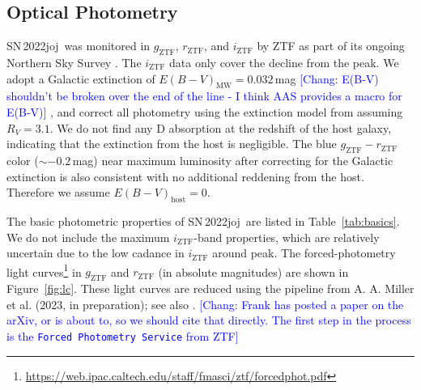 \documentclass[twocolumn]{aastex631}
\newcommand{\sn}{SN\,2022joj}
\newcommand{\chang}[1]{\textcolor{blue}{[Chang: #1]}}
\begin{document}
\begin{CJK*}{UTF8}{gbsn}
\subsection{Optical Photometry}
\sn\ was monitored in $g_\mathrm{ZTF}$, $r_\mathrm{ZTF}$, and $i_\mathrm{ZTF}$ by ZTF as part of its ongoing Northern Sky Survey \citep{Bellm_ZTF_2019b}. The $i_\mathrm{ZTF}$ data only cover the decline from the peak. We adopt a Galactic extinction of $E(B-V)_\mathrm{MW}=0.032$\,mag \chang{E(B-V) shouldn't be broken over the end of the line - I think AAS provides a macro for E(B-V)} \citep{Schlafly2011}, and correct all photometry using the extinction model from \citet{Fitzpatrick1999} assuming $R_V=3.1$. We do not find any  D absorption at the redshift of the host galaxy, indicating that the extinction from the host is negligible. The blue $g_\mathrm{ZTF}-r_\mathrm{ZTF}$ color ($\sim$$-0.2$\,mag) near maximum luminosity after correcting for the Galactic extinction is also consistent with no additional reddening from the host. Therefore we assume $E(B-V)_\mathrm{host}=0$.

The basic photometric properties of \sn\ are listed in Table~\ref{tab:basics}. We do not include the maximum $i_\mathrm{ZTF}$-band properties, which are relatively uncertain due to the low cadance in $i_\mathrm{ZTF}$ around peak. 
The forced-photometry light curves\footnote{\url{https://web.ipac.caltech.edu/staff/fmasci/ztf/forcedphot.pdf}} in $g_\mathrm{ZTF}$ and $r_\mathrm{ZTF}$ (in absolute magnitudes) are shown in Figure~\ref{fig:lc}. These light curves are reduced using the pipeline from A. A. Miller et al. (2023, in preparation); see also \citet{Yao_2019}. \chang{Frank has posted a paper on the arXiv, or is about to, so we should cite that directly. The first step in the process is the \texttt{Forced Photometry Service} from ZTF}




\end{CJK*}
\end{document}
